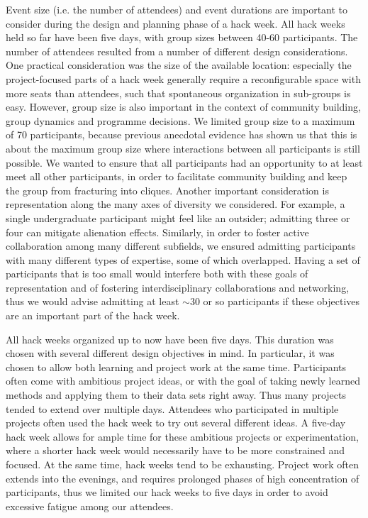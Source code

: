 Event size (i.e. the number of attendees) and event durations are important to consider during the design and planning phase of a hack week. All hack weeks held so far have been five days, with group sizes between 40-60 participants. The number of attendees resulted from a number of different design considerations. One practical consideration was the size of the available location: especially the project-focused parts of a hack week generally require a reconfigurable space with more seats than attendees, such that spontaneous organization in sub-groups is easy. However, group size is also important in the context of community building, group dynamics and programme decisions. We limited group size to a maximum of 70 participants, because previous anecdotal evidence has shown us that this is about the maximum group size where interactions between all participants is still possible. We wanted to ensure that all participants had an opportunity to at least meet all other participants, in order to facilitate community building and keep the group from fracturing into cliques. Another important consideration is representation along the many axes of diversity we considered. For example, a single undergraduate participant might feel like an outsider; admitting three or four can mitigate alienation effects. Similarly, in order to foster active collaboration among many different subfields, we ensured admitting participants with many different types of expertise, some of which overlapped. Having a set of participants that is too small would interfere both with these goals of representation and of fostering interdisciplinary collaborations and networking, thus we would advise admitting at least $\sim$30 or so participants if these objectives are an important part of the hack week.

All hack weeks organized up to now have been five days. This duration was chosen with several different design objectives in mind. In particular, it was chosen to allow both learning and project work at the same time. Participants often come with ambitious project ideas, or with the goal of taking newly learned methods and applying them to their data sets right away. Thus many projects tended to extend over multiple days. Attendees who participated in multiple projects often used the hack week to try out several different ideas. A five-day hack week allows for ample time for these ambitious projects or experimentation, where a shorter hack week would necessarily have to be more constrained and focused. At the same time, hack weeks tend to be exhausting. Project work often extends into the evenings, and requires prolonged phases of high concentration of participants, thus we limited our hack weeks to five days in order to avoid excessive fatigue among our attendees.

